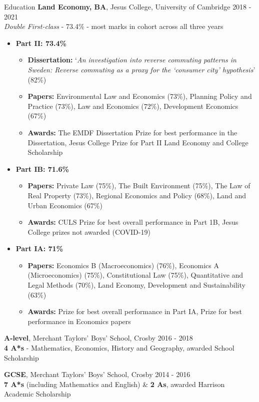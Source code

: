 \documentclass{resume} %
\begin{document}
\begin{rSection}{Education}
{\bf Land Economy, BA}, Jesus College, University of Cambridge \hfill {2018 - 2021}\\
\textit{Double First-class} - 73.4\% - most marks in cohort across all three years\\
\vspace{-1.5em}
 \begin{itemize}
     \itemsep -3pt {} 
    \item \textbf{Part II: 73.4\% }
     \begin{itemize}
     \vspace{-.5em}
     \itemsep -3pt {} 
    \item \textbf{Dissertation: }`\textit{An investigation into reverse commuting patterns in Sweden: Reverse commuting as a proxy for the ‘consumer city’ hypothesis}'  (82\%)
    \item \textbf{Papers:} Environmental Law and Economics (73\%), Planning Policy and Practice (73\%), Law and Economics (72\%), Development Economics (67\%)
    \item \textbf{Awards:} The EMDF Dissertation Prize for best performance in the Dissertation, Jesus College Prize for Part II Land Economy and College Scholarship
        \end{itemize}
    \item \textbf{Part IB: 71.6\%}
     \begin{itemize}
     \vspace{-.5em}
     \itemsep -3pt {} 
    \item \textbf{Papers:} Private Law (75\%), The Built Environment (75\%), The Law of Real Property (73\%), Regional Economics and Policy (68\%), Land and Urban Economics (67\%)
    \item \textbf{Awards:} CULS Prize for best overall performance in Part 1B, Jesus College prizes not awarded (COVID-19)
        \end{itemize}
    \item \textbf{Part IA: 71\%}
    \begin{itemize}
     \vspace{-.5em}
     \itemsep -3pt {} 
    \item \textbf{Papers:} Economics B (Macroeconomics) (76\%), Economics A (Microeconomics) (75\%), Constitutional Law (75\%), Quantitative and Legal Methods (70\%), Land Economy, Development and Sustainability (63\%)
    \item \textbf{Awards:} 
    Prize for best overall performance in Part IA, Prize for best performance in Economics papers
        \end{itemize}
 \end{itemize}

 {\bf A-level}, Merchant Taylors' Boys' School, Crosby \hfill {2016 - 2018}\\
\textbf{4 A*s} - Mathematics, Economics, History and Geography, awarded School Scholarship

  {\bf GCSE}, Merchant Taylors' Boys' School, Crosby \hfill {2014 - 2016}\\
\textbf{7 A*s} (including Mathematics and English) \& \textbf{2 As}, awarded Harrison Academic Scholarship


\end{rSection}
\end{document}
